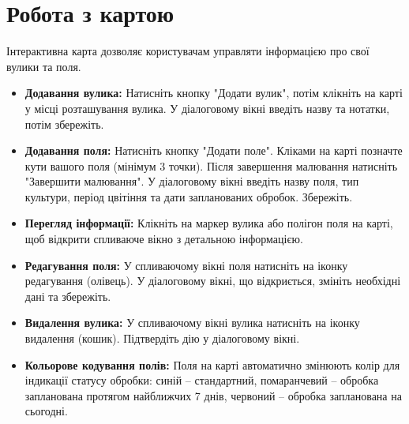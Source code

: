 \section*{Робота з картою}
Інтерактивна карта дозволяє користувачам управляти інформацією про свої вулики та поля.
\begin{itemize}
    \item \textbf{Додавання вулика:} Натисніть кнопку "Додати вулик", потім клікніть на карті у місці розташування вулика. У діалоговому вікні введіть назву та нотатки, потім збережіть.
    \item \textbf{Додавання поля:} Натисніть кнопку "Додати поле". Кліками на карті позначте кути вашого поля (мінімум 3 точки). Після завершення малювання натисніть "Завершити малювання". У діалоговому вікні введіть назву поля, тип культури, період цвітіння та дати запланованих обробок. Збережіть.
    \item \textbf{Перегляд інформації:} Клікніть на маркер вулика або полігон поля на карті, щоб відкрити спливаюче вікно з детальною інформацією.
    \item \textbf{Редагування поля:} У спливаючому вікні поля натисніть на іконку редагування (олівець). У діалоговому вікні, що відкриється, змініть необхідні дані та збережіть.
    \item \textbf{Видалення вулика:} У спливаючому вікні вулика натисніть на іконку видалення (кошик). Підтвердіть дію у діалоговому вікні.
    \item \textbf{Кольорове кодування полів:} Поля на карті автоматично змінюють колір для індикації статусу обробки: синій – стандартний, помаранчевий – обробка запланована протягом найближчих 7 днів, червоний – обробка запланована на сьогодні.
\end{itemize} 
